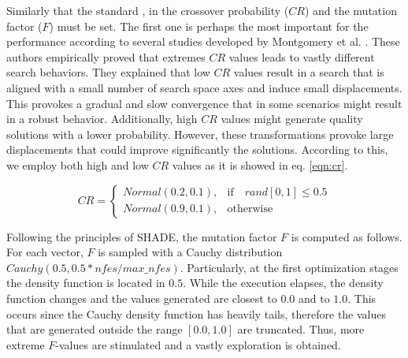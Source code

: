 %
Similarly that the standard \DE{}, in \DEEDM{} the crossover probability ($CR$) and the mutation factor ($F$) must be set.
%
The first one is perhaps the most important for the performance according to several studies developed by Montgomery 
et al. \cite{montgomery2010analysis}.
%
These authors empirically proved that extremes $CR$ values leads to vastly different search behaviors.
%
They explained that low $CR$ values result in a search that is aligned with a small number of search space axes and
induce small displacements.
%
This provokes a gradual and slow convergence that in some scenarios might result in a robust behavior.
%
Additionally, high $CR$ values might generate quality solutions with a lower probability.
%
However, these transformations provoke large displacements that could improve significantly the solutions.
%
According to this, we employ both high and low $CR$ values as it is showed in eq. \ref{eqn:cr}.

\begin{equation} \label{eqn:cr}
CR = 
\begin{cases}
     Normal(0.2, 0.1),& \text{if} \quad rand[0,1] \leq 0.5  \\
     Normal(0.9, 0.1),              & \text{otherwise}
\end{cases}
\end{equation}


Following the principles of SHADE, the mutation factor $F$ is computed as follows. %
%
For each vector, $F$ is sampled with a Cauchy distribution $Cauchy(0.5, 0.5*nfes/max\_nfes)$.
%
Particularly, at the first optimization stages the density function is located in $0.5$.
%
While the execution elapses, the density function changes and the values generated are closest to $0.0$ and to $1.0$.
%
This occurs since the Cauchy density function has heavily tails, therefore the values that are generated outside the range $[0.0, 1.0]$ are truncated.
%
Thus, more extreme $F$-values are stimulated and a vastly exploration is obtained.
%
%



